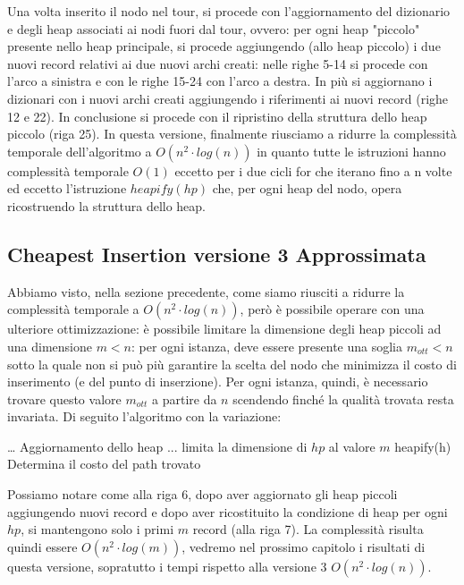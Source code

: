 \documentclass[a4paper,12pt]{report}
\begin{document}
Una volta inserito il nodo nel tour, si procede con l'aggiornamento del dizionario e degli heap associati ai nodi fuori dal tour, ovvero: per ogni heap "piccolo" presente nello heap principale, si procede aggiungendo (allo heap piccolo) i due nuovi record relativi ai due nuovi archi creati: nelle righe 5-14 si procede con l'arco a sinistra e con le righe 15-24 con l'arco a destra. In più si aggiornano i dizionari con i nuovi archi creati aggiungendo i riferimenti ai nuovi record (righe 12 e 22).
In conclusione si procede con il ripristino della struttura dello heap piccolo (riga 25). \newline In questa versione, finalmente riusciamo a ridurre la complessità temporale dell'algoritmo a $O(n^2 \cdot log(n))$ in quanto tutte le istruzioni hanno complessità temporale $O(1)$ eccetto per i due cicli for che iterano fino a n volte ed eccetto l'istruzione $heapify(hp)$ che, per ogni heap del nodo, opera ricostruendo la struttura dello heap.

\subsection{Cheapest Insertion versione 3 Approssimata}
Abbiamo visto, nella sezione precedente, come siamo riusciti a ridurre la complessità temporale a $O(n^2 \cdot log(n))$, però è possibile operare con una ulteriore ottimizzazione: è possibile limitare la dimensione degli heap piccoli ad una dimensione $m < n$: per ogni istanza, deve essere presente una soglia $m_{ott} < n$ sotto la quale non si può più garantire la scelta del nodo che minimizza il costo di inserimento (e del punto di inserzione). Per ogni istanza, quindi, è necessario trovare questo valore $m_{ott}$ a partire da $n$ scendendo finché la qualità trovata resta invariata. Di seguito l'algoritmo con la variazione:
\begin{tcolorbox}[colframe=black, colback=white, boxrule=0.5pt, title=Cheapest Insertion Versione 3 Approssimata, coltitle=black, fonttitle=\bfseries, colbacktitle=white, breakable]
  \begin{algorithmic}[1]
      \State \dots
        \State Aggiornamento dello heap ...
      \EndFor
        \State limita la dimensione di $hp$ al valore $m$
      \EndFor
      \State heapify(h)
    \EndWhile
    \State Determina il costo del path trovato
  \end{algorithmic}
\end{tcolorbox}
Possiamo notare come alla riga 6, dopo aver aggiornato gli heap piccoli aggiungendo nuovi record e dopo aver ricostituito la condizione di heap per ogni $hp$, si mantengono solo i primi $m$ record (alla riga 7). La complessità risulta quindi essere $O(n^2 \cdot log(m))$, vedremo nel prossimo capitolo i risultati di questa versione, sopratutto i tempi rispetto alla versione 3 $O(n^2 \cdot log(n))$.
\end{document}
